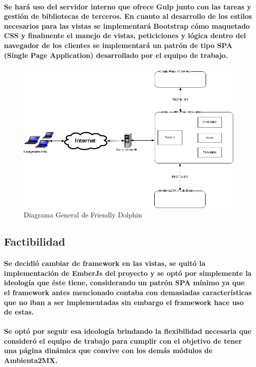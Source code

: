     \paragraph{Se hará uso del servidor interno que ofrece Gulp junto con las tareas y gestión de bibliotecas de terceros. En cuanto al desarrollo de los estilos necesarios para las vistas se implementará Bootstrap cómo maquetado CSS y finalmente el manejo de vistas, peticiciones y lógica dentro del navegador de los clientes se implementará un patrón de tipo SPA (Single Page Application)\cite{36} desarrollado por el equipo de trabajo.}
    \begin{figure}[b!]
      \centering
        \includegraphics[width=\textwidth]{./images/DiagramaFriendlyDolphin.png}
      \caption{Diagrama General de Friendly Dolphin}
    \end{figure}
  \subsection{Factibilidad}   
    \paragraph{Se decidió cambiar de framework en las vistas, se quitó la implementación de EmberJs del proyecto y se optó por simplemente la ideología que éste tiene, considerando un patrón SPA\cite{36} mínimo ya que el framework antes mencionado contaba con demasiadas características que no iban a ser implementadas sin embargo el framework hace uso de estas.}
    \paragraph{Se optó por seguir esa ideología brindando la flexibilidad necesaria que consideró el equipo de trabajo para cumplir con el objetivo de tener una página dinámica que convive con los demás módulos de Ambienta2MX.}
